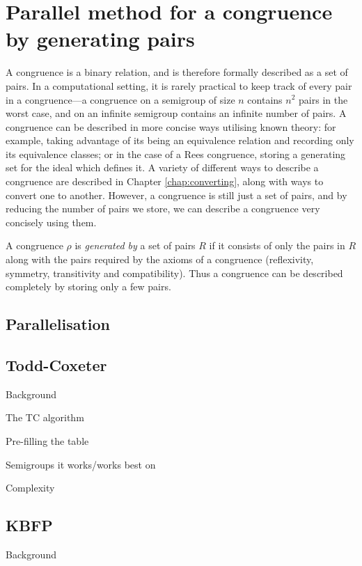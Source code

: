 \chapter{Parallel method for a congruence by generating pairs}
\label{chap:pairs}

A congruence is a binary relation, and is therefore formally described as a set
of pairs.  In a computational setting, it is rarely practical to keep track of
every pair in a congruence---a congruence on a semigroup of size $n$ contains
$n^2$ pairs in the worst case, and on an infinite semigroup contains an infinite
number of pairs.  A congruence can be described in more concise ways utilising
known theory: for example, taking advantage of its being an equivalence relation
and recording only its equivalence classes; or in the case of a Rees congruence,
storing a generating set for the ideal which defines it.  A variety of different
ways to describe a congruence are described in Chapter \ref{chap:converting},
along with ways to convert one to another.  However, a congruence is still just
a set of pairs, and by reducing the number of pairs we store, we can describe a
congruence very concisely using them.

A congruence $\rho$ is \textit{generated by} a set of pairs $R$ if it consists
of only the pairs in $R$ along with the pairs required by the axioms of a
congruence (reflexivity, symmetry, transitivity and compatibility).  Thus a
congruence can be described completely by storing only a few pairs.

\section{Parallelisation}

\section{Todd-Coxeter}
\label{sec:tc}

Background

The TC algorithm

Pre-filling the table

Semigroups it works/works best on

Complexity

\section{KBFP}
\label{sec:kbfp}

Background

